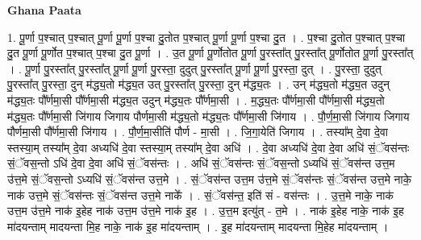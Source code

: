 \documentclass[17pt]{extarticle}
\begin{document}
\textbf{Ghana Paata } \newline

1. पू॒र्णा प॒श्चात् प॒श्चात् पू॒र्णा पू॒र्णा प॒श्चा दु॒तोत प॒श्चात् पू॒र्णा पू॒र्णा प॒श्चा दु॒त । . प॒श्चा दु॒तोत प॒श्चात् प॒श्चा दु॒त पू॒र्णा पू॒र्णोत प॒श्चात् प॒श्चा दु॒त पू॒र्णा । . उ॒त पू॒र्णा पू॒र्णोतोत पू॒र्णा पु॒रस्ता᳚त् पु॒रस्ता᳚त् पू॒र्णोतोत पू॒र्णा पु॒रस्ता᳚त् । . पू॒र्णा पु॒रस्ता᳚त् पु॒रस्ता᳚त् पू॒र्णा पू॒र्णा पु॒रस्ता॒ दुदुत् पु॒रस्ता᳚त् पू॒र्णा पू॒र्णा पु॒रस्ता॒ दुत् । . पु॒रस्ता॒ दुदुत् पु॒रस्ता᳚त् पु॒रस्ता॒ दुन् म॑द्ध्य॒तो म॑द्ध्य॒त उत् पु॒रस्ता᳚त् पु॒रस्ता॒ दुन् म॑द्ध्य॒तः । . उन् म॑द्ध्य॒तो म॑द्ध्य॒त उदुन् म॑द्ध्य॒तः पौ᳚र्णमा॒सी पौ᳚र्णमा॒सी म॑द्ध्य॒त उदुन् म॑द्ध्य॒तः पौ᳚र्णमा॒सी । . म॒द्ध्य॒तः पौ᳚र्णमा॒सी पौ᳚र्णमा॒सी म॑द्ध्य॒तो म॑द्ध्य॒तः पौ᳚र्णमा॒सी जि॑गाय जिगाय पौर्णमा॒सी म॑द्ध्य॒तो म॑द्ध्य॒तः पौ᳚र्णमा॒सी जि॑गाय । . पौ॒र्ण॒मा॒सी जि॑गाय जिगाय पौर्णमा॒सी पौ᳚र्णमा॒सी जि॑गाय । . पौ॒र्ण॒मा॒सीति॑ पौर्ण - मा॒सी । . जि॒गा॒येति॑ जिगाय । . तस्या᳚म् दे॒वा दे॒वा स्तस्या॒म् तस्या᳚म् दे॒वा अध्यधि॑ दे॒वा स्तस्या॒म् तस्या᳚म् दे॒वा अधि॑ । . दे॒वा अध्यधि॑ दे॒वा दे॒वा अधि॑ सं॒ॅवस॑न्तः सं॒ॅवस॒न्तो ऽधि॑ दे॒वा दे॒वा अधि॑ सं॒ॅवस॑न्तः । . अधि॑ सं॒ॅवस॑न्तः सं॒ॅवस॒न्तो ऽध्यधि॑ सं॒ॅवस॑न्त उत्त॒म उ॑त्त॒मे सं॒ॅवस॒न्तो ऽध्यधि॑ सं॒ॅवस॑न्त उत्त॒मे । . सं॒ॅवस॑न्त उत्त॒म उ॑त्त॒मे सं॒ॅवस॑न्तः सं॒ॅवस॑न्त उत्त॒मे नाके॒ नाक॑ उत्त॒मे सं॒ॅवस॑न्तः सं॒ॅवस॑न्त उत्त॒मे नाके᳚ । . सं॒ॅवस॑न्त॒ इति॑ सं - वस॑न्तः । . उ॒त्त॒मे नाके॒ नाक॑ उत्त॒म उ॑त्त॒मे नाक॑ इ॒हेह नाक॑ उत्त॒म उ॑त्त॒मे नाक॑ इ॒ह । . उ॒त्त॒म इत्यु॑त् - त॒मे । . नाक॑ इ॒हेह नाके॒ नाक॑ इ॒ह मा॑दयन्ताम् मादयन्ता मि॒ह नाके॒ नाक॑ इ॒ह मा॑दयन्ताम् । . इ॒ह मा॑दयन्ताम् मादयन्ता मि॒हेह मा॑दयन्ताम् । \newline
\end{document}
